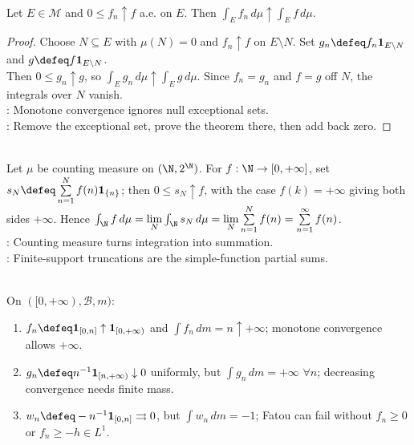 \begin{corollary} \label{cor:monotone-convergence-ae} \\
Let $E\in\mathcal{M}$ and $0\leq f_n\uparrow f$ a.e. on $E$. Then $\int_Ef_n\,d\mu\uparrow\int_Ef\,d\mu$.
\begin{proof}
Choose $N\subseteq E$ with $\mu(N)=0$ and $f_n\uparrow f$ on $E\setminus N$. Set $g_n\defeq f_n\mathbf{1}_{E\setminus N}$ and $g\defeq f\mathbf{1}_{E\setminus N}$.\\
Then $0\leq g_n\uparrow g$, so $\int_Eg_n\,d\mu\uparrow\int_Eg\,d\mu$. Since $f_n=g_n$ and $f=g$ off $N$, the integrals over $N$ vanish.\\
: Monotone convergence ignores null exceptional sets.\\
: Remove the exceptional set, prove the theorem there, then add back zero.
\end{proof}
\end{corollary}

\begin{example} \label{ex:counting-measure-integral-is-series} \\
Let $\mu$ be counting measure on $(\N,2^\N)$. For $f:\N\to[0,+\infty]$, set $s_N\defeq\sum\limits_{n=1}^{N}f(n)\mathbf{1}_{\{n\}}$; then $0\leq s_N\uparrow f$, with the case $f(k)=+\infty$ giving both sides $+\infty$. Hence $\int_{\N} f\,d\mu=\lim\limits_N\int_{\N}s_N\,d\mu =\lim\limits_N\sum\limits_{n=1}^{N}f(n) =\sum\limits_{n=1}^{\infty}f(n)$.\\
: Counting measure turns integration into summation.\\
: Finite-support truncations are the simple-function partial sums.
\end{example}

\begin{example} \label{ex:monotone-fatou-boundary-tests} \\
On $([0,+\infty),\mathcal{B},m)$:
\begin{enumerate}[label=(\roman*)]
\setlength{\itemsep}{0pt}
\item $f_n\defeq\mathbf{1}_{[0,n]}\uparrow\mathbf{1}_{[0,+\infty)}$ and $\int f_n\,dm=n\uparrow+\infty$; monotone convergence allows $+\infty$.
\item $g_n\defeq n^{-1}\mathbf{1}_{[n,+\infty)}\downarrow0$ uniformly, but $\int g_n\,dm=+\infty$ $\forall n$; decreasing convergence needs finite mass.
\item $w_n\defeq-n^{-1}\mathbf{1}_{[0,n]}\rightrightarrows0$, but $\int w_n\,dm=-1$; Fatou can fail without $f_n\geq0$ or $f_n\geq-h\in L^1$.
\end{enumerate}
\end{example}

